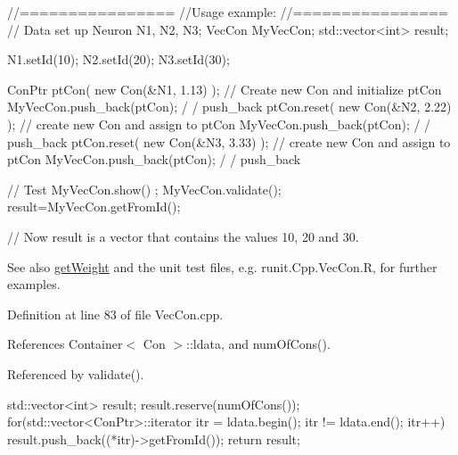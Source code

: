 \begin{DoxyCode}
  //================
  //Usage example:
  //================
        // Data set up
                        Neuron N1, N2, N3;
                        VecCon MyVecCon;
                        std::vector<int> result;

                        N1.setId(10);
                        N2.setId(20);
                        N3.setId(30);

                        ConPtr ptCon( new Con(&N1, 1.13) );       // Create
       new Con and initialize ptCon
                        MyVecCon.push_back(ptCon);                              /
      / push_back
                        ptCon.reset(  new Con(&N2, 2.22) );             // create
       new Con and assign to ptCon
                        MyVecCon.push_back(ptCon);                              /
      / push_back
                        ptCon.reset(  new Con(&N3, 3.33) );             // create
       new Con and assign to ptCon
                        MyVecCon.push_back(ptCon);                              /
      / push_back

        // Test
                        MyVecCon.show() ;
                        MyVecCon.validate();
                        result=MyVecCon.getFromId();

        // Now result is a vector that contains the values 10, 20 and 30.
\end{DoxyCode}


\begin{DoxySeeAlso}{See also}
\hyperlink{classvec_con_a76f10669494f2247d036ae6a1f296873}{getWeight} and the unit test files, e.g. runit.Cpp.VecCon.R, for further examples. 
\end{DoxySeeAlso}


Definition at line 83 of file VecCon.cpp.



References Container$<$ Con $>$::ldata, and numOfCons().



Referenced by validate().


\begin{DoxyCode}
                                  {
        std::vector<int> result;
        result.reserve(numOfCons());
        for(std::vector<ConPtr>::iterator itr = ldata.begin();   itr != 
      ldata.end();   itr++)   { result.push_back((*itr)->getFromId()); }
        return result;
}
\end{DoxyCode}


